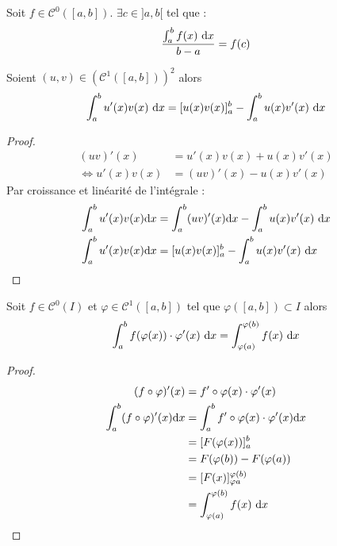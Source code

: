 \begin{theorem}
    Soit $f \in \mathcal{C}^0([a, b])$. $\exists c \in ]a, b[$  tel que :
    \[ \frac{\int_{a}^{b} f(x) \ \diffd x}{b - a} = f(c) \]
\end{theorem}

\begin{theorem}
	Soient $(u, v) \in (\mathcal{C}^1([a, b]))^2$ alors
	\begin{align*}
		\int_a^b u'(x) v(x) \ \diffd x = [u(x)v(x)]_a^b - \int_a^b u(x) v'(x) \ \diffd x
	\end{align*}
  \end{theorem}

\begin{proof}
    \begin{align*}
        (uv)'(x) &= u'(x) v(x) + u(x)v'(x) \\
        \iff u'(x)v(x) &= (uv)'(x) - u(x)v'(x)
    \end{align*}
    Par croissance et linéarité de l'intégrale :
    \begin{align*}
        \int_a^b u'(x)v(x) \diffd x &= \int_a^b (uv)'(x) \diffd x - \int_a^b u(x)v'(x) \ \diffd x \\
        \int_a^b u'(x)v(x) \diffd x &=  [u(x)v(x)]_a^b - \int_a^b u(x)v'(x) \ \diffd x 
    \end{align*}
\end{proof}

\begin{theorem}
	Soit $f \in \mathcal{C}^0(I)$ et $\varphi \in \mathcal{C}^1([a, b])$ tel que $\varphi ([a, b]) \subset I$ alors 
	\begin{align*}
		\int_a^b f(\varphi(x)) \cdot \varphi'(x) \ \diffd x = \int_{\varphi(a)}^{\varphi(b)} f(x) \ \diffd x
	\end{align*}
\end{theorem}

\begin{proof}
    \begin{align*}
        (f \circ \varphi)'(x) &= f' \circ \varphi(x) \cdot \varphi'(x) \\
        \int_a^b (f \circ \varphi)'(x) \diffd x &= \int_a^b f' \circ \varphi(x)  \cdot \varphi'(x) \diffd x \\
         &= [F(\varphi(x))]_a^b \\
         &= F(\varphi(b)) - F(\varphi(a)) \\
         &= [F(x)]_{\varphi{a}}^{\varphi(b)} \\
         &= \int_{\varphi(a)}^{\varphi(b)} f(x) \ \diffd x 
    \end{align*}
\end{proof}

